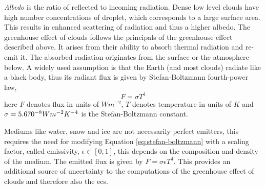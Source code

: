 \textit{Albedo} is the ratio of reflected to incoming radiation. Dense low level clouds have high number concentrations of droplet, which corresponds to a large surface area. This results in enhanced scattering of radiation and thus a higher albedo. The greenhouse effect of clouds follows the principals of the greenhouse effect described above. It arises from their ability to absorb thermal radiation and re-emit it. The absorbed radiation originates from the surface or the atmosphere below. A widely used assumption is that the Earth (and most clouds) radiate like a black body, thus its radiant flux is given by Stefan-Boltzmann fourth-power law, 
\begin{equation} \label{eq:stefan-boltzmann}
    F = \sigma T ^4 %
\end{equation}
here $F$ denotes flux in units of $W m^{-2}$, $T$ denotes temperature in units of $K$ and \\  $\sigma = 5.670 \time 10^{-8} W m^{-2} K^{-4}$ is the Stefan-Boltzmann constant. 


Mediums like water, snow and ice are not necessarily perfect emitters, this requires the need for modifying Equation \eqref{eq:stefan-boltzmann} with a scaling factor, called emissivity, $\epsilon \in [0, 1]$,
this depends on the composition and density of the medium. The emitted flux is given by $ F = \sigma \epsilon T ^4$. 
This provides an additional source of uncertainty to the computations of the greenhouse effect of clouds and therefore also the \acrshort{ecs}.

